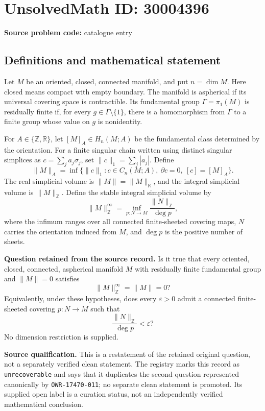 \documentclass[11pt]{article}
\newcommand{\Z}{\mathbb{Z}}
\newcommand{\R}{\mathbb{R}}
\begin{document}
\section*{UnsolvedMath ID: 30004396}
\textbf{Source problem code:} catalogue entry
\subsection{Definitions and mathematical statement}
Let \(M\) be an oriented, closed, connected manifold, and put \(n=\dim M\). Here closed means compact with empty boundary. The manifold is aspherical if its universal covering space is contractible. Its fundamental group \(\Gamma=\pi_1(M)\) is residually finite if, for every \(g\in\Gamma\setminus\{1\}\), there is a homomorphism from \(\Gamma\) to a finite group whose value on \(g\) is nonidentity.

For \(A\in\{\Z,\R\}\), let \([M]_A\in H_n(M;A)\) be the fundamental class determined by the orientation. For a finite singular chain written using distinct singular simplices as \(c=\sum_j a_j\sigma_j\), set \(\lVert c\rVert_1=\sum_j|a_j|\). Define
\[
\lVert M\rVert_A
=\inf\bigl\{\lVert c\rVert_1 : c\in C_n(M;A),\ \partial c=0,\ [c]=[M]_A\bigr\}.
\]
The real simplicial volume is \(\lVert M\rVert=\lVert M\rVert_{\R}\), and the integral simplicial volume is \(\lVert M\rVert_{\Z}\). Define the stable integral simplicial volume by
\[
\lVert M\rVert_{\Z}^{\infty}
=\inf_{p:N\to M}\frac{\lVert N\rVert_{\Z}}{\deg p},
\]
where the infimum ranges over all connected finite-sheeted covering maps, \(N\) carries the orientation induced from \(M\), and \(\deg p\) is the positive number of sheets.

\textbf{Question retained from the source record.} Is it true that every oriented, closed, connected, aspherical manifold \(M\) with residually finite fundamental group and \(\lVert M\rVert=0\) satisfies
\[
\lVert M\rVert_{\Z}^{\infty}=\lVert M\rVert=0?
\]
Equivalently, under these hypotheses, does every \(\varepsilon>0\) admit a connected finite-sheeted covering \(p:N\to M\) such that
\[
\frac{\lVert N\rVert_{\Z}}{\deg p}<\varepsilon?
\]
No dimension restriction is supplied.

\textbf{Source qualification.} This is a restatement of the retained original question, not a separately verified clean statement. The registry marks this record as \texttt{unrecoverable} and says that it duplicates the second question represented canonically by \texttt{OWR-17470-011}; no separate clean statement is promoted. Its supplied open label is a curation status, not an independently verified mathematical conclusion.
\end{document}
